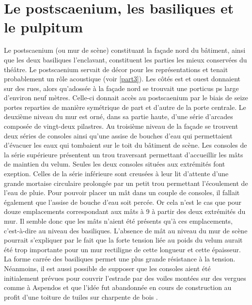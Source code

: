 \section{Le \gls{postscaenium}, les \glspl{basilique} et le \gls{pulpitum}}
\label{sect_postscaenium}
		
		Le \gls{postscaenium} (ou mur de scène) constituant la façade nord du bâtiment, ainsi que les deux \glspl{basilique} l'enclavant, constituent les parties les mieux conservées du théâtre. Le \gls{postscaenium} servait de décor pour les représentations et tenait probablement un rôle acoustique (voir \autoref{part3}). Les côtés est et ouest donnaient sur des rues, alors qu'adossée à la façade nord se trouvait une \gls{porticus ps} large d'environ neuf mètres. Celle-ci donnait accès au \gls{postscaenium} par le biais de seize portes reparties de manière symétrique de part et d'autre de la porte centrale. Le deuxième niveau du mur est orné, dans sa partie haute, d'une série d'arcades composée de vingt-deux \glspl{pilastre}. Au troisième niveau de la façade se trouvent deux séries de \glspl{console} ainsi qu'une assise de bouches d'eau qui permettaient d'évacuer les eaux qui tombaient sur le toit du bâtiment de scène. Les \glspl{console} de la série supérieure présentent un trou traversant permettant d'accueillir les mâts de maintien du \gls{velum}. Seules les deux \glspl{console} situées aux extrémités font exeption. Celles de la série inférieure sont creusées à leur lit d'attente d'une grande mortaise circulaire prolongée par un petit trou permettant l'écoulement de l'eau de pluie. Pour pouvoir placer un mât dans un couple de \glspl{console}, il fallait également que l'assise de bouche d'eau soit percée. Or cela n'est le cas que pour douze emplacements correspondant aux mâts  à 9 à partir des deux extrémités du mur. Il semble donc que les mâts n'aient été présents qu'à ces emplacements, c'est-à-dire au niveau des \glspl{basilique}. L'absence de mât au niveau du mur de scène pourrait s'expliquer par le fait que la forte tension liée au poids du \gls{velum} aurait été trop importante pour un mur rectiligne de cette longueur et cette épaisseur. La forme carrée des basiliques permet une plus grande résistance à la tension. Néanmoins, il est aussi possible de supposer que les \glspl{console} aient été initialement prévues pour couvrir l'estrade par des voiles montées sur des vergues comme à Aspendos et que l'idée fut abandonnée en cours de construction au profit d'une toiture de tuiles sur charpente de bois \cite[p. 144-147]{moretti}. 
		
